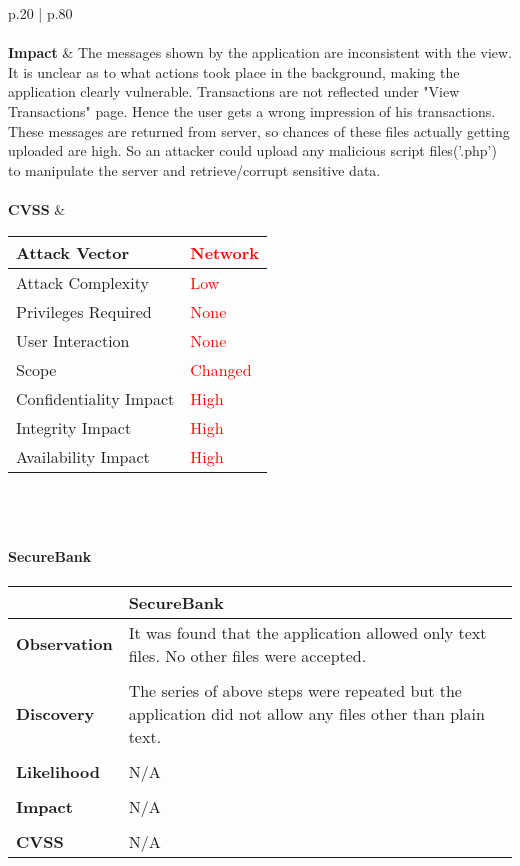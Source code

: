 \begin{longtable*}{p{.20\textwidth} | p{.80\textwidth}}
    \\\\
    \textbf{Impact} &
        The messages shown by the application are inconsistent with the view. It is unclear as to what actions took place in the background, making the application clearly vulnerable. Transactions are not reflected under "View Transactions" page. Hence the user gets a wrong impression of his transactions. These messages are returned from server, so chances of these files actually getting uploaded are high. So an attacker could upload any malicious script files('.php') to manipulate the server and retrieve/corrupt sensitive data.
    \\\\
    \textbf{CVSS} &
       \begin{tabular}{| l | l |}
             \hline
             Attack Vector		& \textcolor{red}{Network}\\
             \hline
             Attack Complexity	& \textcolor{red}{Low} \\
             \hline
             Privileges Required & \textcolor{red}{None} \\
             \hline
             User Interaction	& \textcolor{red}{None} \\
             \hline
             Scope		& \textcolor{red}{Changed} \\
             \hline
             Confidentiality Impact	& \textcolor{red}{High} \\
             \hline
             Integrity Impact		& \textcolor{red}{High} \\
             \hline
             Availability Impact		& \textcolor{red}{High} \\
             \hline
             \end{tabular}
           \\
    \\
    \hline
\end{longtable*}
\paragraph{SecureBank} \mbox{}
\begin{longtable*}{p{.20\textwidth} | p{.80\textwidth}}
    \hline
    & \textbf{SecureBank} \\
    \hline
    \textbf{Observation} &
        It was found that the application allowed only text files. No other files were accepted.
    \\\\
    \textbf{Discovery} &
	    The series of above steps were repeated but the application did not allow any files other than plain text.
    \\\\
    \textbf{Likelihood} &
        N/A
    \\\\
    \textbf{Impact} &
		N/A
    \\\\
    \textbf{CVSS} &
        N/A
    \\
    \hline
\end{longtable*}
\clearpage
